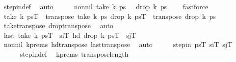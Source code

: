 \begin{isabellebody}
\ step{\isacharunderscore}{\kern0pt}in{\isacharunderscore}{\kern0pt}def\ \isamarkupfalse%
\ auto\isanewline
\ \ \isamarkupfalse%
\ \isamarkupfalse%
\ non{\isacharunderscore}{\kern0pt}nil{\isacharcolon}{\kern0pt}\ {\isachardoublequoteopen}take\ k\ ps\ {\isasymnoteq}\ {\isacharbrackleft}{\kern0pt}{\isacharbrackright}{\kern0pt}{\isachardoublequoteclose}\ {\isachardoublequoteopen}drop\ k\ ps\ {\isasymnoteq}\ {\isacharbrackleft}{\kern0pt}{\isacharbrackright}{\kern0pt}{\isachardoublequoteclose}\ \isamarkupfalse%
\ fastforce{\isacharplus}{\kern0pt}\isanewline
\ \ \isamarkupfalse%
\ {\isachardoublequoteopen}take\ k\ {\isacharquery}{\kern0pt}psT\ {\isacharequal}{\kern0pt}\ transpose\ {\isacharparenleft}{\kern0pt}take\ k\ ps{\isacharparenright}{\kern0pt}{\isachardoublequoteclose}\ {\isachardoublequoteopen}drop\ k\ {\isacharquery}{\kern0pt}psT\ {\isacharequal}{\kern0pt}\ transpose\ {\isacharparenleft}{\kern0pt}drop\ k\ ps{\isacharparenright}{\kern0pt}{\isachardoublequoteclose}\isanewline
\ \ \ \ \isamarkupfalse%
\ take{\isacharunderscore}{\kern0pt}transpose\ drop{\isacharunderscore}{\kern0pt}transpose\ \isamarkupfalse%
\ auto\isanewline
\ \ \isamarkupfalse%
\ \isamarkupfalse%
\ {\isachardoublequoteopen}last\ {\isacharparenleft}{\kern0pt}take\ k\ {\isacharquery}{\kern0pt}psT{\isacharparenright}{\kern0pt}\ {\isacharequal}{\kern0pt}\ {\isacharquery}{\kern0pt}s\isactrlsub iT{\isachardoublequoteclose}\ {\isachardoublequoteopen}hd\ {\isacharparenleft}{\kern0pt}drop\ k\ {\isacharquery}{\kern0pt}psT{\isacharparenright}{\kern0pt}\ {\isacharequal}{\kern0pt}\ {\isacharquery}{\kern0pt}s\isactrlsub jT{\isachardoublequoteclose}\isanewline
\ \ \ \ \isamarkupfalse%
\ non{\isacharunderscore}{\kern0pt}nil\ k{\isacharunderscore}{\kern0pt}prems\ hd{\isacharunderscore}{\kern0pt}transpose\ last{\isacharunderscore}{\kern0pt}transpose\ \isamarkupfalse%
\ auto\isanewline
\ \ \isamarkupfalse%
\ \isamarkupfalse%
\ {\isachardoublequoteopen}step{\isacharunderscore}{\kern0pt}in\ {\isacharquery}{\kern0pt}psT\ {\isacharquery}{\kern0pt}s\isactrlsub iT\ {\isacharquery}{\kern0pt}s\isactrlsub jT{\isachardoublequoteclose}\isanewline
\ \ \ \ \isamarkupfalse%
\ step{\isacharunderscore}{\kern0pt}in{\isacharunderscore}{\kern0pt}def\ \isamarkupfalse%
\ k{\isacharunderscore}{\kern0pt}prems\ transpose{\isacharunderscore}{\kern0pt}length\ \isamarkupfalse%

\end{isabellebody}
